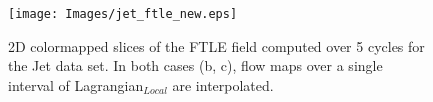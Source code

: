 \begin{figure}[!t]
\centering
\texttt{[image: Images/jet\_ftle\_new.eps]}
\vspace{-4mm}
\caption{2D colormapped slices of the FTLE field computed over 5 cycles for the Jet data set. In both cases (b, c), flow maps over a single interval of Lagrangian$_{Local}$ are interpolated.}
\vspace{-6mm}
\label{jet_ftle}
\end{figure}
